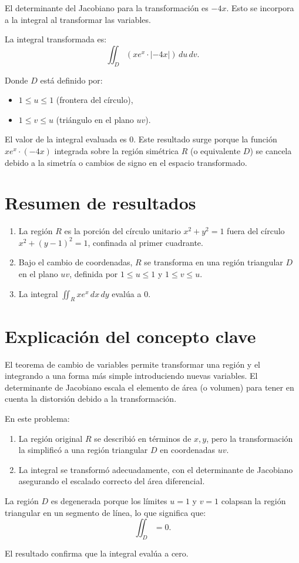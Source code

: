 El determinante del Jacobiano para la transformación es \( -4x \). Esto se incorpora a la integral al transformar las variables.

La integral transformada es:
\[
\iint_D (x e^x \cdot |-4x|) \, du \, dv.
\]

Donde \( D \) está definido por:
\begin{itemize}
    \item \( 1 \leq u \leq 1 \) (frontera del círculo),
    \item \( 1 \leq v \leq u \) (triángulo en el plano \( uv \)).
\end{itemize}

El valor de la integral evaluada es \( 0 \). Este resultado surge porque la función \( x e^x \cdot (-4x) \) integrada sobre la región simétrica \( R \) (o equivalente \( D \)) se cancela debido a la simetría o cambios de signo en el espacio transformado.

\section*{Resumen de resultados}
\begin{enumerate}
    \item La región \( R \) es la porción del círculo unitario \( x^2 + y^2 = 1 \) fuera del círculo \( x^2 + (y-1)^2 = 1 \), confinada al primer cuadrante.
    \item Bajo el cambio de coordenadas, \( R \) se transforma en una región triangular \( D \) en el plano \( uv \), definida por \( 1 \leq u \leq 1 \) y \( 1 \leq v \leq u \).
    \item La integral \( \iint_R x e^x \, dx \, dy \) evalúa a \( 0 \).
\end{enumerate}

\section*{Explicación del concepto clave}

El teorema de cambio de variables permite transformar una región y el integrando a una forma más simple introduciendo nuevas variables. El determinante de Jacobiano escala el elemento de área (o volumen) para tener en cuenta la distorsión debido a la transformación.

En este problema:
\begin{enumerate}
    \item La región original \( R \) se describió en términos de \( x, y \), pero la transformación la simplificó a una región triangular \( D \) en coordenadas \( uv \).
    \item La integral se transformó adecuadamente, con el determinante de Jacobiano asegurando el escalado correcto del área diferencial.
\end{enumerate}

La región \( D \) es degenerada porque los límites \( u = 1 \) y \( v = 1 \) colapsan la región triangular en un segmento de línea, lo que significa que:
\[
\iint_D = 0.
\]

El resultado confirma que la integral evalúa a cero.
